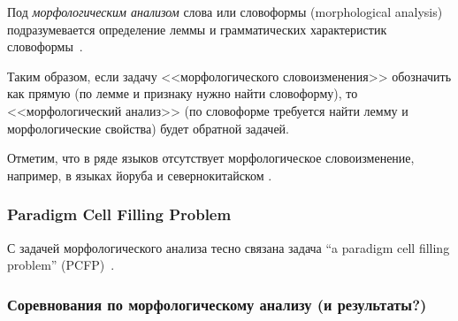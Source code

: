 Под \emph{морфологическим анализом} слова или словоформы (morphological analysis)
подразумевается определение леммы и
грамматических характеристик словоформы~\cite{MitreninaNikolaevLando2016}.

Таким образом, если задачу <<морфологического словоизменения>> обозначить как прямую
(по лемме и признаку нужно найти словоформу),
то <<морфологический анализ>> (по словоформе требуется найти
лемму и морфологические свойства) будет обратной задачей.


Отметим, что в ряде языков отсутствует морфологическое словоизменение,
например, в языках йоруба и севернокитайском .




\subsubsection{Paradigm Cell Filling Problem}

С задачей морфологического анализа тесно связана задача
``a paradigm cell filling problem'' (PCFP)~\cite{Ackerman08PartsAndWholes}.



\subsubsection{Соревнования по морфологическому анализу (и результаты?)}

